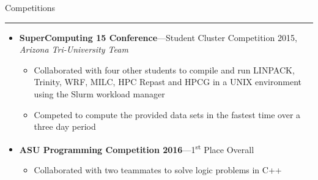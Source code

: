 \documentclass[10pt,oneside]{article}
\newcommand{\sectitle}[1]{
  \begin{flushleft}{\selectfont\Large#1}\end{flushleft}
}
\newenvironment{ressection}[1]{
  \vspace{2pt}
  \sectitle{#1}
  \vspace{-10pt}\rule{\textwidth}{0.5pt}
  \vspace{-10pt}
  \begin{itemize}[leftmargin=13pt]
  \vspace{3pt}
}{
  \end{itemize}
}
\newcommand{\ressubitem}[1]{
  \vspace{-1pt}
  \item \begin{flushleft} #1 \end{flushleft}
}
\newcommand{\resmeditem}[2]{
  \vspace{-5pt}
  \item
  \textbf{#1}---#2
}
\newcommand{\resbigitemline}[3]{
  \vspace{-5pt}
  \item
  \textbf{#1}---#2, 
  \textit{#3}
}
\newenvironment{ressubsecshort}[2]{
  \resmeditem{#1}{#2}
  \vspace{-4pt}
  \begin{itemize}
  }{
  \end{itemize}
}
\newenvironment{ressubsecline}[3]{
  \resbigitemline{#1}{#2}{#3}
  \vspace{-2pt}
  \begin{itemize}
}{
  \end{itemize}
}
\begin{document}
\begin{ressection}{Competitions}
  \begin{ressubsecline}{SuperComputing 15 Conference}{Student Cluster Competition 2015}{Arizona Tri-University Team}
    \ressubitem{Collaborated with four other students to compile and run LINPACK, Trinity, WRF, MILC, HPC Repast and
    HPCG in a UNIX environment using the Slurm workload manager}
  \ressubitem{Competed to compute the provided data sets in the fastest time over a three day period}
  \end{ressubsecline}
  \begin{ressubsecshort}{ASU Programming Competition 2016}{1\textsuperscript{st} Place Overall}
    \ressubitem{Collaborated with two teammates to solve logic problems in C++}
  \end{ressubsecshort}
\end{ressection}
\end{document}

